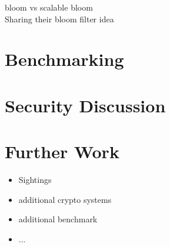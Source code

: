 \documentclass{eplmastersthesis}
\begin{document}
bloom vs scalable bloom \\

Sharing their bloom filter idea \\

\section{Benchmarking}

\section{Security Discussion}

\section{Further Work}
\begin{itemize}
\item Sightings
\item additional crypto systems
\item additional benchmark
\item ...
\end{itemize}


\newpage


\newpage

\backcoverpage
\end{document}
